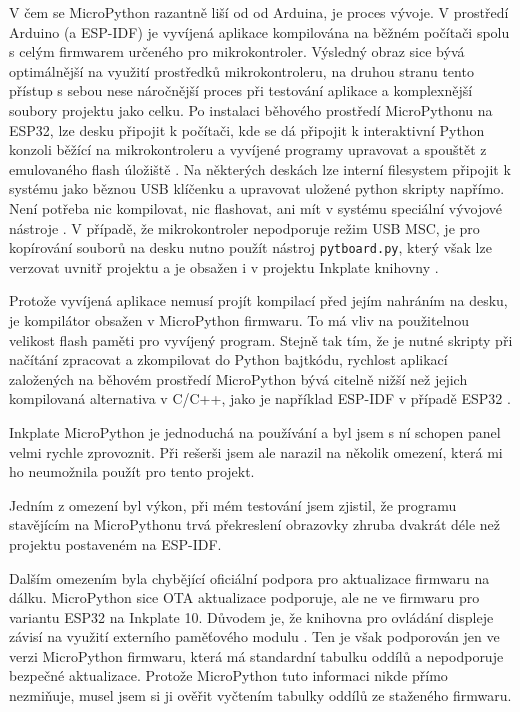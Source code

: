 V čem se MicroPython razantně liší od od Arduina, je proces vývoje. V prostředí Arduino (a ESP-IDF) je vyvíjená aplikace kompilována na běžném počítači spolu s celým firmwarem určeného pro mikrokontroler. Výsledný obraz sice bývá optimálnější na využití prostředků mikrokontroleru, na druhou stranu tento přístup s sebou nese náročnější proces při testování aplikace a komplexnější soubory projektu jako celku. Po instalaci běhového prostředí MicroPythonu na ESP32, lze desku připojit k počítači, kde se dá připojit k interaktivní Python konzoli běžící na mikrokontroleru a vyvíjené programy upravovat a spouštět z emulovaného flash úložiště \cite{MicroPythonPythonMicrocontrollers}. Na některých deskách lze interní filesystem připojit k systému jako běznou USB klíčenku a upravovat uložené python skripty napřímo. Není potřeba nic kompilovat, nic flashovat, ani mít v systému speciální vývojové nástroje \cite{WorkingFilesystemsMicroPython}. V případě, že mikrokontroler nepodporuje režim USB MSC, je pro kopírování souborů na desku nutno použít nástroj \lstinline|pytboard.py|, který však lze verzovat uvnitř projektu a je obsažen i v projektu Inkplate knihovny \cite{PyboardPyTool}.

Protože vyvíjená aplikace nemusí projít kompilací před jejím nahráním na desku, je kompilátor obsažen v MicroPython firmwaru. To má vliv na použitelnou velikost flash paměti pro vyvíjený program. Stejně tak tím, že je nutné skripty při načítání zpracovat a zkompilovat do Python bajtkódu, rychlost aplikací založených na běhovém prostředí MicroPython bývá citelně nižší než jejich kompilovaná alternativa v C/C++, jako je například ESP-IDF v případě ESP32 \cite{plauskaPerformanceEvaluationMicroPython2022}.

Inkplate MicroPython je jednoduchá na používání a byl jsem s ní schopen panel velmi rychle zprovoznit. Při rešerši jsem ale narazil na několik omezení, která mi ho neumožnila použít pro tento projekt.

Jedním z omezení byl výkon, při mém testování jsem zjistil, že programu stavějícím na MicroPythonu trvá překreslení obrazovky zhruba dvakrát déle než projektu postaveném na ESP-IDF. 

Dalším omezením byla chybějící oficiální podpora pro aktualizace firmwaru na dálku. MicroPython sice OTA aktualizace podporuje, ale ne ve firmwaru pro variantu ESP32 na Inkplate 10. Důvodem je, že knihovna pro ovládání displeje závisí na využití externího paměťového modulu \cite{SolderedElectronicsInkplatemicropython2024}. Ten je však podporován jen ve verzi MicroPython firmwaru, která má standardní tabulku oddílů a nepodporuje bezpečné aktualizace. Protože MicroPython tuto informaci nikde přímo nezmiňuje, musel jsem si ji ověřit vyčtením tabulky oddílů ze staženého firmwaru.

